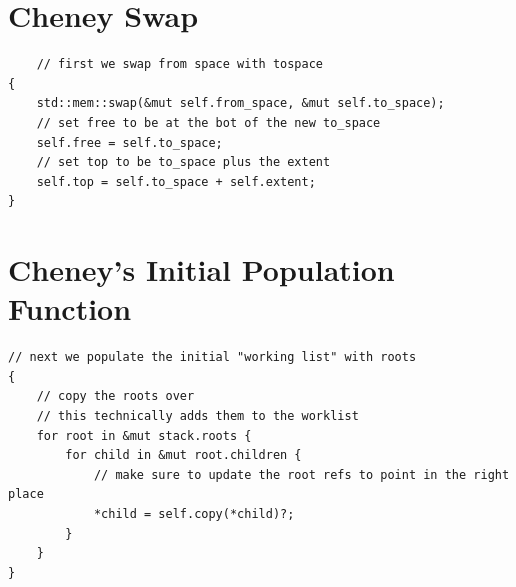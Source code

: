 \documentclass[index]{subfiles}
\begin{document}
\section{Cheney Swap}
\begin{verbatim}
    // first we swap from space with tospace
{
    std::mem::swap(&mut self.from_space, &mut self.to_space);
    // set free to be at the bot of the new to_space
    self.free = self.to_space;
    // set top to be to_space plus the extent
    self.top = self.to_space + self.extent;
}
\end{verbatim}
\section{Cheney's Initial Population Function}
\begin{verbatim}
// next we populate the initial "working list" with roots
{
    // copy the roots over
    // this technically adds them to the worklist
    for root in &mut stack.roots {
        for child in &mut root.children {
            // make sure to update the root refs to point in the right place
            *child = self.copy(*child)?;
        }
    }
}
\end{verbatim}
\end{document}
